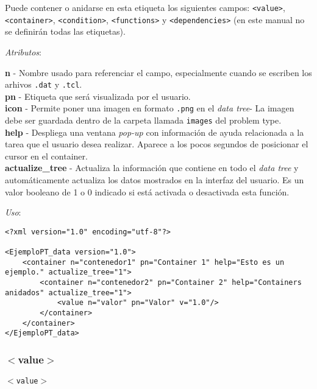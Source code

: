 \documentclass[10pt, a4paper, twocolumn]{article} %
\begin{document}
Puede contener o anidarse en esta etiqueta los siguientes campos: \texttt{<value>}, \texttt{<container>}, \texttt{<condition>}, \texttt{<functions>} y \texttt{<dependencies>} (en este manual no se definirán todas las etiquetas).

\vspace{0.15cm}
\textit{Atributos}:

\vspace{0.15cm}
	\textbf{n} - Nombre usado para referenciar el campo, especialmente cuando se escriben los arhivos \texttt{.dat} y \texttt{.tcl}.\\
	\textbf{pn} - Etiqueta que será visualizada por el usuario.\\
	\textbf{icon} - Permite poner una imagen en formato \texttt{.png} en el \textit{data tree}- La imagen debe ser guardada dentro de la carpeta llamada \texttt{images} del problem type.\\
	\textbf{help} - Despliega una ventana \textit{pop-up} con información de ayuda relacionada a la tarea que el usuario desea realizar. Aparece a los pocos segundos de posicionar el cursor en el container.\\
	\textbf{actualize\_tree} - Actualiza la información que contiene en todo el \textit{data tree} y automáticamente actualiza los datos mostrados en la interfaz del usuario. Es un valor booleano de 1 o 0 indicado si está activada o desactivada esta función.
\vspace{0.15cm}

\textit{Uso}:
\vspace{0.15cm}

\lstset{language=XML} 
\begin{lstlisting}[caption={Ejemplo de <container> anidados.}]
<?xml version="1.0" encoding="utf-8"?>

<EjemploPT_data version="1.0">
	<container n="contenedor1" pn="Container 1" help="Esto es un ejemplo." actualize_tree="1">
		<container n="contenedor2" pn="Container 2" help="Containers anidados" actualize_tree="1">
			<value n="valor" pn="Valor" v="1.0"/>
		</container>
	</container>
</EjemploPT_data>
\end{lstlisting}

\subsubsection{$<$value$>$}
\label{subsubsec:value}
\vspace{0.20cm}
\begin{center}
	\texttt{$<$value$>$}
\end{center}
\vspace{0.20cm}
\end{document}

